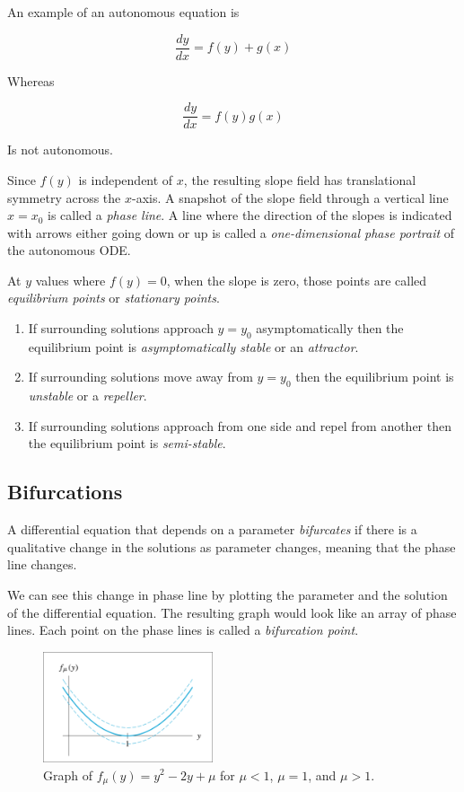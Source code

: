 An example of an autonomous equation is

\[
    \frac{dy}{dx} = f(y) + g(x)
\]

Whereas

\[
    \frac{dy}{dx} = f(y)g(x)
\]

Is not autonomous.

Since $f(y)$ is independent of $x$, the resulting slope field has translational symmetry across the $x$-axis. A snapshot of the slope field through a vertical line $x = x_0$ is called a \textit{phase line}. A line where the direction of the slopes is indicated with arrows either going down or up is called a \textit{one-dimensional phase portrait} of the autonomous ODE.

At $y$ values where $f(y) = 0$, when the slope is zero, those points are called \textit{equilibrium points} or \textit{stationary points}.
\begin{enumerate}
    \item If surrounding solutions approach $y = y_0$ asymptomatically then the equilibrium point is \textit{asymptomatically stable} or an \textit{attractor}.
    \item If surrounding solutions move away from $y = y_0$ then the equilibrium point is \textit{unstable} or a \textit{repeller}.
    \item If surrounding solutions approach from one side and repel from another then the equilibrium point is \textit{semi-stable}.
\end{enumerate}

\subsection{Bifurcations}

A differential equation that depends on a parameter \textit{bifurcates} if there is a qualitative change in the solutions as parameter changes, meaning that the phase line changes.

We can see this change in phase line by plotting the parameter and the solution of the differential equation. The resulting graph would look like an array of phase lines. Each point on the phase lines is called a \textit{bifurcation point}.

\begin{figure}[H]
    \centering
    \includegraphics[width=50mm]{content/diffeq/images/bifurcation_0.png}
    \caption{Graph of $f_\mu(y) = y^2 - 2y + \mu$ for $\mu < 1$, $\mu = 1$, and $\mu > 1$.}
\end{figure}

